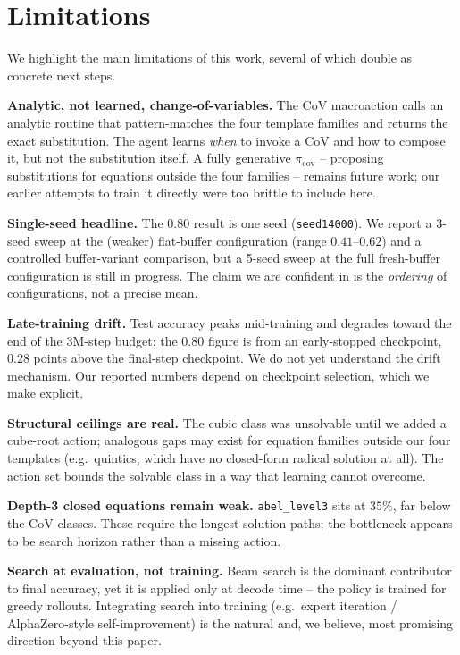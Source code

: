 \documentclass{article}
\theoremstyle{plain}
\theoremstyle{definition}
\theoremstyle{remark}
\begin{document}
\section{Limitations}
\label{sec:limitations}
We highlight the main limitations of this work, several of which double as concrete next steps.

\textbf{Analytic, not learned, change-of-variables.} The CoV macroaction calls an analytic routine that pattern-matches the four template families and returns the exact substitution. The agent learns \emph{when} to invoke a CoV and how to compose it, but not the substitution itself. A fully generative $\pi_{\text{cov}}$ -- proposing substitutions for equations outside the four families -- remains future work; our earlier attempts to train it directly were too brittle to include here.

\textbf{Single-seed headline.} The $0.80$ result is one seed (\texttt{seed14000}). We report a 3-seed sweep at the (weaker) flat-buffer configuration (range $0.41$--$0.62$) and a controlled buffer-variant comparison, but a 5-seed sweep at the full fresh-buffer configuration is still in progress. The claim we are confident in is the \emph{ordering} of configurations, not a precise mean.

\textbf{Late-training drift.} Test accuracy peaks mid-training and degrades toward the end of the $3\text{M}$-step budget; the $0.80$ figure is from an early-stopped checkpoint, $0.28$ points above the final-step checkpoint. We do not yet understand the drift mechanism. Our reported numbers depend on checkpoint selection, which we make explicit.

\textbf{Structural ceilings are real.} The cubic class was unsolvable until we added a cube-root action; analogous gaps may exist for equation families outside our four templates (e.g.\ quintics, which have no closed-form radical solution at all). The action set bounds the solvable class in a way that learning cannot overcome.

\textbf{Depth-3 closed equations remain weak.} \texttt{abel\_level3} sits at $35\%$, far below the CoV classes. These require the longest solution paths; the bottleneck appears to be search horizon rather than a missing action.

\textbf{Search at evaluation, not training.} Beam search is the dominant contributor to final accuracy, yet it is applied only at decode time -- the policy is trained for greedy rollouts. Integrating search into training (e.g.\ expert iteration / AlphaZero-style self-improvement) is the natural and, we believe, most promising direction beyond this paper.
\end{document}
